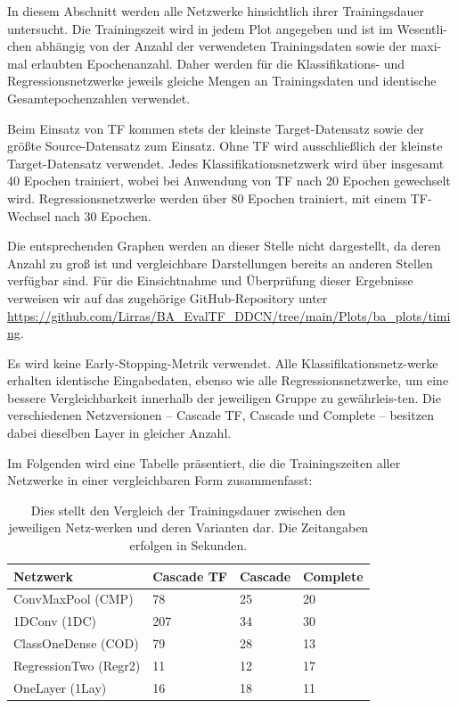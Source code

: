 In diesem Abschnitt werden alle Netzwerke hinsichtlich ihrer Trainingsdauer untersucht. Die Trainingszeit wird in jedem Plot angegeben und ist im Wesentli-chen abhängig von der Anzahl der verwendeten Trainingsdaten sowie der maxi-mal erlaubten Epochenanzahl. Daher werden für die 
Klassifikations- und Regressionsnetzwerke jeweils gleiche Mengen an Trainingsdaten und identische Gesamtepochenzahlen verwendet.

Beim Einsatz von TF kommen stets der kleinste Target-Datensatz sowie der größte Source-Datensatz zum Einsatz. Ohne TF wird 
ausschließlich der kleinste Target-Datensatz verwendet. Jedes Klassifikationsnetzwerk wird über insgesamt 40 Epochen trainiert, wobei bei 
Anwendung von TF nach 20 Epochen gewechselt wird. Regressionsnetzwerke werden über 80 Epochen trainiert, mit einem TF-Wechsel nach 30 Epochen.

Die entsprechenden Graphen werden an dieser Stelle nicht dargestellt, da deren Anzahl zu groß ist und vergleichbare Darstellungen bereits an 
anderen Stellen verfügbar sind. Für die Einsichtnahme und Überprüfung dieser Ergebnisse verweisen wir auf das zugehörige GitHub-Repository 
unter \url{https://github.com/Lirras/BA_EvalTF_DDCN/tree/main/Plots/ba_plots/timing}. 

Es wird keine Early-Stopping-Metrik verwendet. Alle Klassifikationsnetz-werke erhalten identische Eingabedaten, ebenso wie alle 
Regressionsnetzwerke, um eine bessere Vergleichbarkeit innerhalb der jeweiligen Gruppe zu gewährleis-ten. Die verschiedenen Netzversionen – 
Cascade TF, Cascade und Complete – besitzen dabei dieselben Layer in gleicher Anzahl.

Im Folgenden wird eine Tabelle präsentiert, die die Trainingszeiten aller Netzwerke in einer vergleichbaren Form zusammenfasst:

\begin{table}[h!]
    \begin{center} 
        \begin{tabular}{l|l|l|l}
            \textbf{Netzwerk} & \textbf{Cascade TF} & \textbf{Cascade} & \textbf{Complete} \\
            \hline
            ConvMaxPool (CMP) & 78 & 25 & 20 \\
            1DConv (1DC) & 207 & 34 & 30 \\
            ClassOneDense (COD) & 79 & 28 & 13 \\
            RegressionTwo (Regr2) & 11 & 12 & 17 \\
            OneLayer (1Lay) & 16 & 18 & 11
        \end{tabular}
        \caption{
            \small{Dies stellt den Vergleich der Trainingsdauer zwischen den jeweiligen Netz-werken und deren Varianten dar. Die Zeitangaben erfolgen in Sekunden.}}
        \label{tab:time}
    \end{center}
\end{table}

